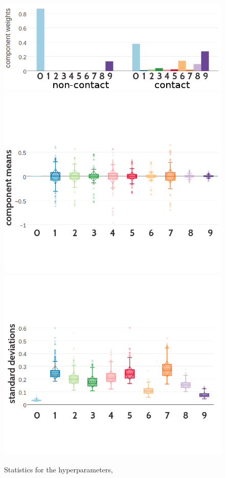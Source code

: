 \documentclass[11pt,a4paper,twoside]{book}
\theoremstyle{definition}
\theoremstyle{definition}
\theoremstyle{remark}
\begin{document}
\begin{figure}
\includegraphics[width=0.9\linewidth]{img/bayesian_model/pll/10/300k_weights_noncontacththr25} \includegraphics[width=0.9\linewidth]{img/bayesian_model/pll/10/300k_mus_noncontactthr25} \includegraphics[width=0.9\linewidth]{img/bayesian_model/pll/10/300k_std_noncontactthr25} \caption{Statistics for the hyperparameters,
}
\end{figure}
\end{document}
